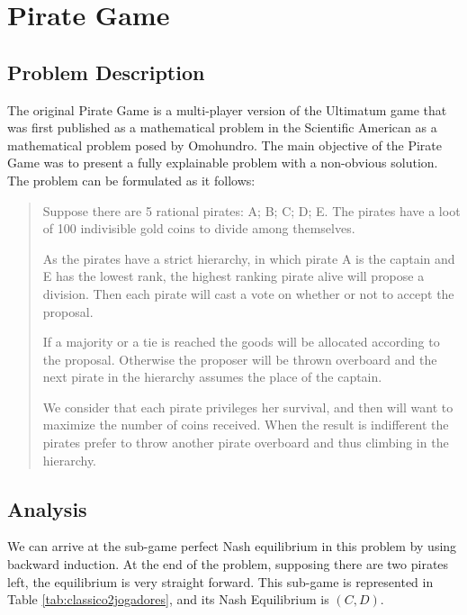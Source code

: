 


\section{Pirate Game}
\label{sec:pirate}



\subsection{Problem Description}
\label{subsec:description}

The original Pirate Game is a multi-player version of the Ultimatum game that was first published as a mathematical problem in the Scientific American as a mathematical problem posed by Omohundro\cite{Stewart1999}. The main objective of the Pirate Game was to present a fully explainable problem with a non-obvious solution. The problem can be formulated as it follows:

\begin{quotation}
Suppose there are 5 rational pirates: A; B; C; D; E. The pirates have a  loot of 100 indivisible gold coins to divide among themselves.


As the pirates have a strict hierarchy, in which pirate A is the captain and E has the lowest rank, the highest ranking pirate alive will propose a division. Then each pirate will cast a vote on whether or not to accept the proposal. 

If a majority or a tie is reached the goods will be allocated according to the proposal. Otherwise the proposer will be thrown overboard and the next pirate in the hierarchy assumes the place of the captain. 

We consider that each pirate privileges her survival, and then will want to maximize the number of coins received. When the result is indifferent the pirates prefer to throw another pirate overboard and thus climbing in the hierarchy. 
\end{quotation}

\subsection{Analysis}
\label{subsec:analysis_PG}

We can arrive at the sub-game perfect Nash equilibrium in this problem by using backward induction. At the end of the problem, supposing there are two pirates left, the equilibrium is very straight forward. This sub-game is represented in Table \ref{tab:classico2jogadores}, and its Nash Equilibrium is $(C,D)$.

